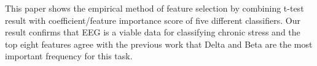 \documentclass[pdflatex,sn-mathphys]{sn-jnl}%
\theoremstyle{thmstyleone}%
\theoremstyle{thmstyletwo}%
\theoremstyle{thmstylethree}%
\begin{document}

This paper shows the empirical method of feature selection by combining t-test result with coefficient/feature importance score of five different classifiers. Our result confirms that EEG is a viable data for classifying chronic stress and the top eight features agree with the previous work that Delta and Beta are the most important frequency for this task.




\end{document}
